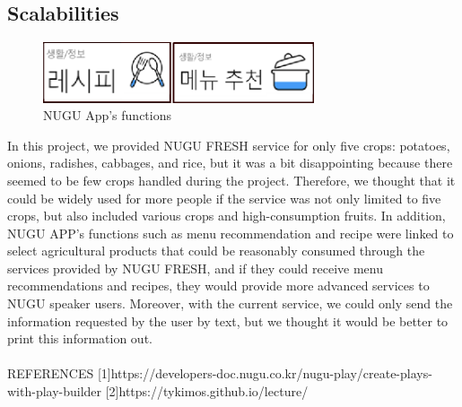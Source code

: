 \documentclass[conference]{IEEEtran}
\begin{document}
\subsection{Scalabilities}
\begin{figure}[h]
\centering
    \includegraphics[width =8cm]{pictures/picture7.eps}
    \hfil
\caption{NUGU App’s functions}
\end{figure}
    In this project, we provided NUGU FRESH service for only five crops: potatoes, onions, radishes, cabbages, and rice, but it was a bit disappointing because there seemed to be few crops handled during the project. Therefore, we thought that it could be widely used for more people if the service was not only limited to five crops, but also included various crops and high-consumption fruits. In addition, NUGU APP's functions such as menu recommendation and recipe were linked to select agricultural products that could be reasonably consumed through the services provided by NUGU FRESH, and if they could receive menu recommendations and recipes, they would provide more advanced services to NUGU speaker users. Moreover, with the current service, we could only send the information requested by the user by text, but we thought it would be better to print this information out.\\
    \\
    
    \centering
    REFERENCES
[1]https://developers-doc.nugu.co.kr/nugu-play/create-plays-with-play-builder
[2]https://tykimos.github.io/lecture/
\end{document}

